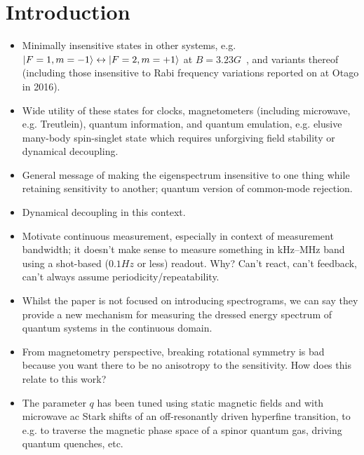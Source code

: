 \documentclass[aps,prl,reprint,superscriptaddress,floatfix]{revtex4-1}
\begin{document}
\section{Introduction}
\label{sec:introduction}
\begin{itemize}
    \item Minimally insensitive states in other systems, e.g. $\vert F=1,m=-1 \rangle  \leftrightarrow \vert F=2,m=+1 \rangle $ at $B=3.23\unit{G}$~\cite{matthews_dynamical_1998}, and variants thereof (including those insensitive to Rabi frequency variations reported on at Otago in 2016).
    \item Wide utility of these states for clocks, magnetometers (including microwave, e.g. Treutlein), quantum information, and quantum emulation, e.g. elusive many-body spin-singlet state which requires unforgiving field stability or dynamical decoupling.
    \item General message of making the eigenspectrum insensitive to one thing while retaining sensitivity to another; quantum version of common-mode rejection.
    \item Dynamical decoupling in this context.
    \item Motivate continuous measurement, especially in context of measurement bandwidth; it doesn't make sense to measure something in kHz--MHz band using a shot-based ($0.1\unit{Hz}$ or less) readout. Why? Can't react, can't feedback, can't always assume periodicity/repeatability.
    \item Whilst the paper is not focused on introducing spectrograms, we can say they provide a new mechanism for measuring the dressed energy spectrum of quantum systems in the continuous domain. 
    \item From magnetometry perspective, breaking rotational symmetry is bad because you want there to be no anisotropy to the sensitivity. How does this relate to this work?
    \item The parameter $q$ has been tuned using static magnetic fields and with microwave ac Stark shifts of an off-resonantly driven hyperfine transition, to e.g. to traverse the magnetic phase space of a spinor quantum gas, driving quantum quenches, etc.    
\end{itemize}
\end{document}
